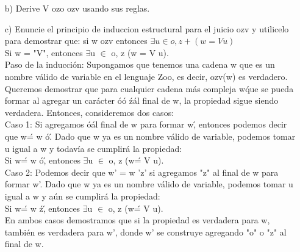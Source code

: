 \documentclass{article}
\begin{document}
\begin{itemize}
\begin{itemize}
                \item[b)] Derive V ozo ozv usando sus reglas.
                \item[c)] Enuncie el principio de induccion estructural para el juicio ozv y utilicelo para demostrar que: si w ozv entonces $\exists u \in {o, z}+ (w = V u)$\\

                Si w = "V", entonces $\exists$u $\in$ o, z (w = V u).\\

                Paso de la inducción: Supongamos que tenemos una cadena w que es un nombre válido de variable en el lenguaje Zoo, es decir, ozv(w) es verdadero. Queremos demostrar que para cualquier cadena más compleja w\' que se pueda formar al agregar un carácter \'o\' o \'z\' al final de w, la propiedad sigue siendo verdadera. Entonces, consideremos dos casos:\\

                Caso 1: Si agregamos \'o\' al final de w para formar w\', entonces podemos decir que w\' = w \'o\'. Dado que w ya es un nombre válido de variable, podemos tomar u igual a w y todavía se cumplirá la propiedad:\\

                Si w\' = w \'o\', entonces $\exists$u $\in$ o, z (w\' = V u).\\

                Caso 2: Podemos decir que w' = w 'z' si agregamos "z" al final de w para formar w'. Dado que w ya es un nombre válido de variable, podemos tomar u igual a w y aún se cumplirá la propiedad:\\ 

                Si w\' = w \'z\', entonces $\exists$u $\in$ o, z (w\' = V u).\\

                En ambos casos demostramos que si la propiedad es verdadera para w, también es verdadera para w', donde w' se construye agregando "o" o "z" al final de w.\\


\end{itemize}
\end{itemize}
\end{document}
